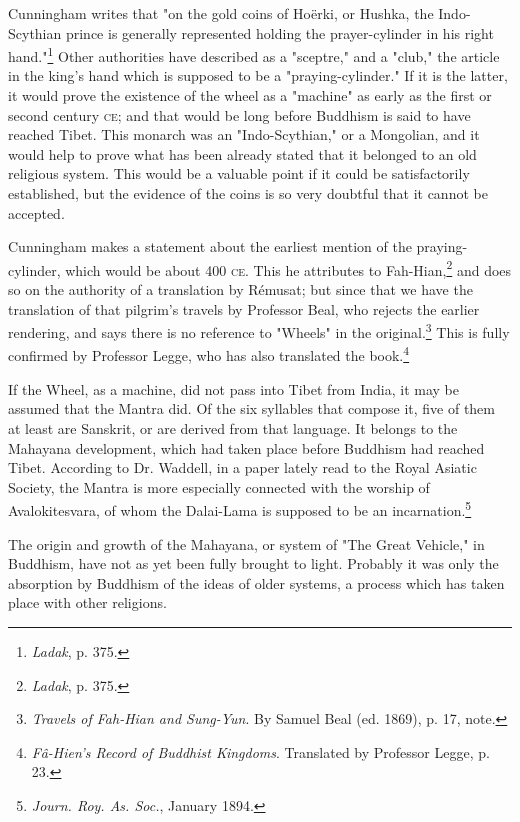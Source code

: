 \documentclass[a4paper, 11pt, oneside, polutonikogreek, english]{article}
\begin{document}
Cunningham writes that "on the gold coins of Hoërki, or Hushka, the Indo-Scythian prince is generally represented holding the prayer-cylinder in his right hand."\footnote{\emph{Ladak}, p. 375.} Other authorities have described as a "sceptre," and a "club," the article in the king's hand which is supposed to be a "praying-cylinder." If it is the latter, it would prove the existence of the wheel as a "machine" as early as the first or second century \textsc{ce}; and that would be long before Buddhism is said to have reached Tibet. This monarch was an "Indo-Scythian," or a Mongolian, and it would help to prove what has been already stated that it belonged to an old religious system. This would be a valuable point if it could be satisfactorily established, but the evidence of the coins is so very doubtful that it cannot be accepted.

Cunningham makes a statement about the earliest mention of the praying-cylinder, which would be about 400 \textsc{ce}. This he attributes to Fah-Hian,\footnote{\emph{Ladak}, p. 375.} and does so on the authority of a translation by Rémusat; but since that we have the translation of that pilgrim's travels by Professor Beal, who rejects the earlier rendering, and says there is no reference to "Wheels" in the original.\footnote{\emph{Travels of Fah-Hian and Sung-Yun}. By Samuel Beal (ed. 1869), p. 17, note.} This is fully confirmed by Professor Legge, who has also translated the book.\footnote{\emph{Fâ-Hien's Record of Buddhist Kingdoms}. Translated by Professor Legge, p. 23.}

If the Wheel, as a machine, did not pass into Tibet from India, it may be assumed that the Mantra did. Of the six syllables that compose it, five of them at least are Sanskrit, or are derived from that language. It belongs to the Mahayana development, which had taken place before Buddhism had reached Tibet. According to Dr. Waddell, in a paper lately read to the Royal Asiatic Society, the Mantra is more especially connected with the worship of Avalokitesvara, of whom the Dalai-Lama is supposed to be an incarnation.\footnote{\emph{Journ. Roy. As. Soc.}, January 1894.}

The origin and growth of the Mahayana, or system of "The Great Vehicle," in Buddhism, have not as yet been fully brought to light. Probably it was only the absorption by Buddhism of the ideas of older systems, a process which has taken place with other religions.
\end{document}
